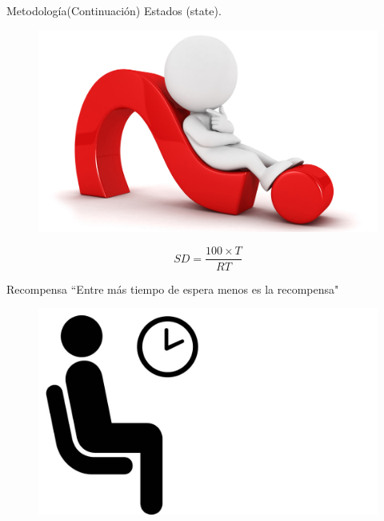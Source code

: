 \documentclass{beamer}
\begin{document}
\begin{frame}{Metodología}{(Continuación)}
	Estados (state).
	\begin{figure}
		\includegraphics[scale = 0.5]{preguntas}
	\end{figure}
	\begin{equation}
		SD = \dfrac{100 \times T}{RT}
	\end{equation}
\end{frame}

\begin{frame}{Recompensa}
	``Entre más tiempo de espera menos es la recompensa"
	\begin{figure}
	\centering
	\includegraphics[scale=0.15]{tiempodeespera}
	\end{figure} 
\end{frame}
\end{document}
